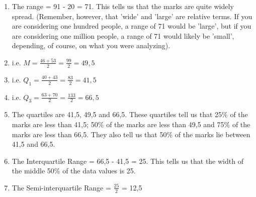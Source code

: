\begin{description}[noitemsep]
\begin{description}[noitemsep]
{\begin{mdframed}[linewidth=4, leftmargin=40, rightmargin=40]
\begin{exercise}
\begin{enumerate}[noitemsep, label=\textbf{Step} \textbf{\arabic*}. ]
\begin{table}[H]
\end{table}
    \par
          \item  
          \label{m39400*id214357}The range = 91 - 20 = 71. This tells us that the marks are quite widely spread. (Remember, however, that 'wide' and 'large' are relative terms. If you are considering one hundred people, a range of 71 would be 'large', but if you are considering one million people, a range of 71 would likely be 'small', depending, of course, on what you were analyzing).\par 
          \item  
          \label{m39400*id214365}i.e. $M=\frac{46+53}{2}=\frac{99}{2}=49,5$\par 
          \item  
          \label{m39400*id214413}i.e. ${Q}_{1}=\frac{40+43}{2}=\frac{83}{2}=41,5$\par 
          \item  
          \label{m39400*id214466}i.e. ${Q}_{3}=\frac{63+70}{2}=\frac{133}{2}=66,5$\par 
          \item  
          \label{m39400*id214518}The quartiles are 41,5, 49,5 and 66,5. These quartiles tell us that 25$\%$ of the marks are less than 41,5; 50$\%$ of the marks are less than 49,5 and 75$\%$ of the marks are less than 66,5. They also tell us that 50$\%$ of the marks lie between 41,5 and 66,5.\par 
          \item  
          \label{m39400*id214562}The Interquartile Range = 66,5 - 41,5 = 25. This tells us that the width of the middle 50$\%$ of the data values is 25.\par 
          \item  
          \label{m39400*id214579}The Semi-interquartile Range = $\frac{25}{2}$ = 12,5\par 
\end{enumerate}
    \end{exercise}
    \end{mdframed}
    }
    \noindent
        \label{m39400*uid81}

\end{description}
\end{description}
